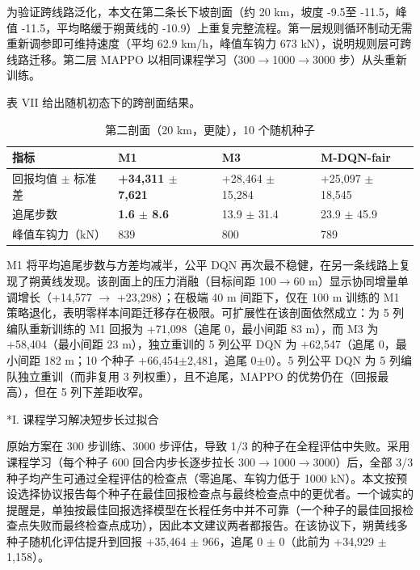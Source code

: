 \documentclass[11pt]{article}
\makeatletter
\renewcommand{\subsection}{\@startsection{subsection}{2}{\z@}{-3.25ex\@plus -1ex \@minus -.2ex}{1.5ex \@plus .2ex}{\normalfont\normalsize\bfseries\sffamily}}
\makeatother
\begin{document}
为验证跨线路泛化，本文在第二条长下坡剖面（约 20 km，坡度 -9.5\textperthousand 至 -11.5\textperthousand，峰值 -11.5\textperthousand，平均略缓于朔黄线的 -10.9\textperthousand）上重复完整流程。第一层规则循环制动无需重新调参即可维持速度（平均 62.9 km/h，峰值车钩力 673 kN），说明规则层可跨线路迁移。第二层 MAPPO 以相同课程学习（300$\rightarrow$1000$\rightarrow$3000 步）从头重新训练。


表 VII 给出随机初态下的跨剖面结果。



\begin{table}[htbp]
\centering
\caption{第二剖面（20 km，更陡），10 个随机种子}
\begin{tabular}{llll}
\toprule
指标 & \textbf{M1} & M3 & M-DQN-fair \\
\midrule
回报均值 $\pm$ 标准差 & \textbf{+34{,}311 $\pm$ 7{,}621} & +28{,}464 $\pm$ 15{,}284 & +25{,}097 $\pm$ 18{,}545 \\
追尾步数 & \textbf{1.6 $\pm$ 8.6} & 13.9 $\pm$ 31.4 & 23.9 $\pm$ 45.9 \\
峰值车钩力（kN） & 839 & 800 & 789 \\
\bottomrule
\end{tabular}
\end{table}

M1 将平均追尾步数与方差均减半，公平 DQN 再次最不稳健，在另一条线路上复现了朔黄线发现。该剖面上的压力消融（目标间距 100$\rightarrow$60 m）显示协同增量单调增长（+14{,}577 $\rightarrow$ +23{,}298）；在极端 40 m 间距下，仅在 100 m 训练的 M1 策略退化，表明零样本间距迁移存在极限。可扩展性在该剖面依然成立：为 5 列编队重新训练的 M1 回报为 +71{,}098（追尾 0，最小间距 83 m），而 M3 为 +58{,}404（最小间距 23 m），独立重训的 5 列公平 DQN 为 +62{,}547（追尾 0，最小间距 182 m；10 个种子 +66{,}454$\pm$2{,}481，追尾 0$\pm$0）。5 列公平 DQN 为 5 列编队独立重训（而非复用 3 列权重），且不追尾，MAPPO 的优势仍在（回报最高），但在 5 列下差距收窄。


\subsection*{I. 课程学习解决短步长过拟合}

原始方案在 300 步训练、3000 步评估，导致 1/3 的种子在全程评估中失败。采用课程学习（每个种子 600 回合内步长逐步拉长 300$\rightarrow$1000$\rightarrow$3000）后，全部 3/3 种子均产生可通过全程评估的检查点（零追尾、车钩力低于 1000 kN）。本文按预设选择协议报告每个种子在最佳回报检查点与最终检查点中的更优者。一个诚实的提醒是，单独按最佳回报选择模型在长程任务中并不可靠（一个种子的最佳回报检查点失败而最终检查点成功），因此本文建议两者都报告。在该协议下，朔黄线多种子随机化评估提升到回报 +35{,}464 $\pm$ 966，追尾 0 $\pm$ 0（此前为 +34{,}929 $\pm$ 1{,}158）。
\end{document}
